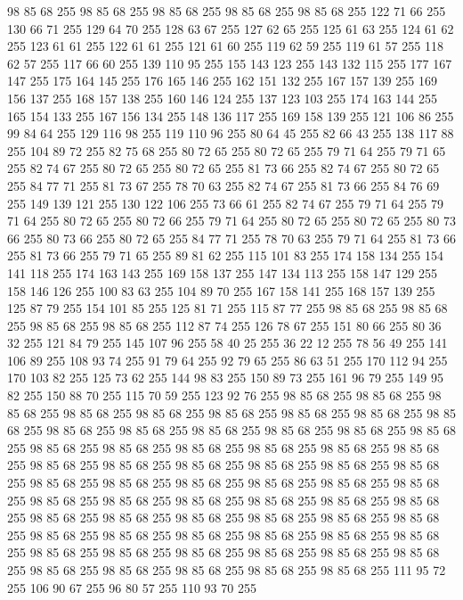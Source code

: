 98 85 68 255 98 85 68 255 98 85 68 255 98 85 68 255 98 85 68 255 122 71 66 255 130 66 71 255 129 64 70 255 128 63 67 255 127 62 65 255 125 61 63 255 124 61 62 255 123 61 61 255 122 61 61 255 121 61 60 255 119 62 59 255 119 61 57 255 118 62 57 255 117 66 60 255 139 110 95 255 155 143 123 255 143 132 115 255 177 167 147 255 175 164 145 255 176 165 146 255 162 151 132 255 167 157 139 255 169 156 137 255 168 157 138 255 160 146 124 255 137 123 103 255 174 163 144 255 165 154 133 255 167 156 134 255 148 136 117 255 169 158 139 255 121 106 86 255 99 84 64 255 129 116 98 255 119 110 96 255 80 64 45 255 82 66 43 255 138 117 88 255 104 89 72 255 82 75 68 255 80 72 65 255 80 72 65 255 79 71 64 255 79 71 65 255 82 74 67 255 80 72 65 255 80 72 65 255 81 73 66 255 82 74 67 255 80 72 65 255 84 77 71 255 81 73 67 255 78 70 63 255 82 74 67 255 81 73 66 255 84 76 69 255 149 139 121 255 130 122 106 255 73 66 61 255
82 74 67 255 79 71 64 255 79 71 64 255 80 72 65 255 80 72 66 255 79 71 64 255 80 72 65 255 80 72 65 255 80 73 66 255 80 73 66 255 80 72 65 255 84 77 71 255 78 70 63 255 79 71 64 255 81 73 66 255 81 73 66 255 79 71 65 255 89 81 62 255 115 101 83 255 174 158 134 255 154 141 118 255 174 163 143 255 169 158 137 255 147 134 113 255 158 147 129 255 158 146 126 255 100 83 63 255 104 89 70 255 167 158 141 255 168 157 139 255 125 87 79 255 154 101 85 255 125 81 71 255 115 87 77 255 98 85 68 255 98 85 68 255 98 85 68 255 98 85 68 255 112 87 74 255 126 78 67 255 151 80 66 255 80 36 32 255 121 84 79 255 145 107 96 255 58 40 25 255 36 22 12 255 78 56 49 255 141 106 89 255 108 93 74 255 91 79 64 255 92 79 65 255 86 63 51 255 170 112 94 255 170 103 82 255 125 73 62 255 144 98 83 255 150 89 73 255 161 96 79 255 149 95 82 255 150 88 70 255 115 70 59 255 123 92 76 255 98 85 68 255 98 85 68 255
98 85 68 255 98 85 68 255 98 85 68 255 98 85 68 255 98 85 68 255 98 85 68 255 98 85 68 255 98 85 68 255 98 85 68 255 98 85 68 255 98 85 68 255 98 85 68 255 98 85 68 255 98 85 68 255 98 85 68 255 98 85 68 255 98 85 68 255 98 85 68 255 98 85 68 255 98 85 68 255 98 85 68 255 98 85 68 255 98 85 68 255 98 85 68 255 98 85 68 255 98 85 68 255 98 85 68 255 98 85 68 255 98 85 68 255 98 85 68 255 98 85 68 255 98 85 68 255 98 85 68 255 98 85 68 255 98 85 68 255 98 85 68 255 98 85 68 255 98 85 68 255 98 85 68 255 98 85 68 255 98 85 68 255 98 85 68 255 98 85 68 255 98 85 68 255 98 85 68 255 98 85 68 255 98 85 68 255 98 85 68 255 98 85 68 255 98 85 68 255 98 85 68 255 98 85 68 255 98 85 68 255 98 85 68 255 98 85 68 255 98 85 68 255 98 85 68 255 98 85 68 255 98 85 68 255 98 85 68 255 111 95 72 255 106 90 67 255 96 80 57 255 110 93 70 255
